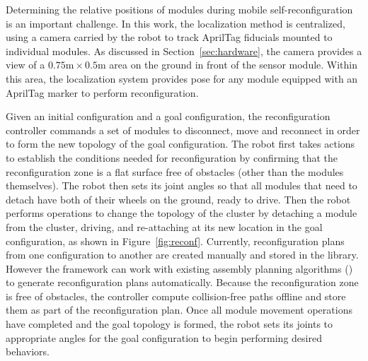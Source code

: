 \documentclass[12pt]{article}
\newcommand{\TODO}[1]{ {\bf \textcolor{red}{TODO:} #1 }}
\begin{document}
Determining the relative positions of modules during mobile self-reconfiguration is an important challenge. 
In this work, the localization method is centralized, using a camera carried by the robot to track AprilTag fiducials mounted to individual modules.
As discussed in Section~\ref{sec:hardware}, the camera provides a view of a $0.75\text{m}\times0.5\text{m}$ area on the ground in front of the sensor module.  
Within this area, the localization system provides pose for any module equipped with an AprilTag marker to perform reconfiguration. 

Given an initial configuration and a goal configuration, the reconfiguration controller commands a set of modules to disconnect, move and reconnect in order to form the new topology of the goal configuration. 
The robot first takes actions to establish the conditions needed for reconfiguration by confirming that the reconfiguration zone is a flat surface free of obstacles (other than the modules themselves).
The robot then sets its joint angles so that all modules that need to detach have both of their wheels on the ground, ready to drive.
Then the robot performs operations to change the topology of the cluster by detaching a module from the cluster, driving, and re-attaching at its new location in the goal configuration, as shown in Figure~\ref{fig:reconf}.
Currently, reconfiguration plans from one configuration to another are created manually and stored in the library. However the framework can work with existing assembly planning algorithms (\cite{Werfel2007,Seo2013}) to generate reconfiguration plans automatically.
Because the reconfiguration zone is free of obstacles, the controller compute collision-free paths offline and store them as part of the reconfiguration plan.
Once all module movement operations have completed and the goal topology is formed, the robot sets its joints to appropriate angles for the goal configuration to begin performing desired behaviors.
\end{document}
